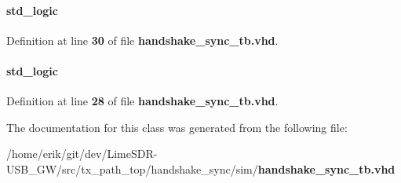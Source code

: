 \paragraph[{inst0\+\_\+en}]{ {\bfseries \textcolor{comment}{std\+\_\+logic}\textcolor{vhdlchar}{ }} \hspace{0.3cm}{\ttfamily [Signal]}}\label{classhandshake__sync__tb_1_1tb__behave_a675d800253d3d20d14d4ca7e9a519f06}


Definition at line {\bf 30} of file {\bf handshake\+\_\+sync\+\_\+tb.\+vhd}.

\paragraph[{reset\+\_\+n}]{ {\bfseries \textcolor{comment}{std\+\_\+logic}\textcolor{vhdlchar}{ }} \hspace{0.3cm}{\ttfamily [Signal]}}\label{classhandshake__sync__tb_1_1tb__behave_a1f070fd63a3a7fa45c907335ea870c5b}


Definition at line {\bf 28} of file {\bf handshake\+\_\+sync\+\_\+tb.\+vhd}.



The documentation for this class was generated from the following file\+:\begin{DoxyCompactItemize}
\item 
/home/erik/git/dev/\+Lime\+S\+D\+R-\/\+U\+S\+B\+\_\+\+G\+W/src/tx\+\_\+path\+\_\+top/handshake\+\_\+sync/sim/{\bf handshake\+\_\+sync\+\_\+tb.\+vhd}\end{DoxyCompactItemize}

